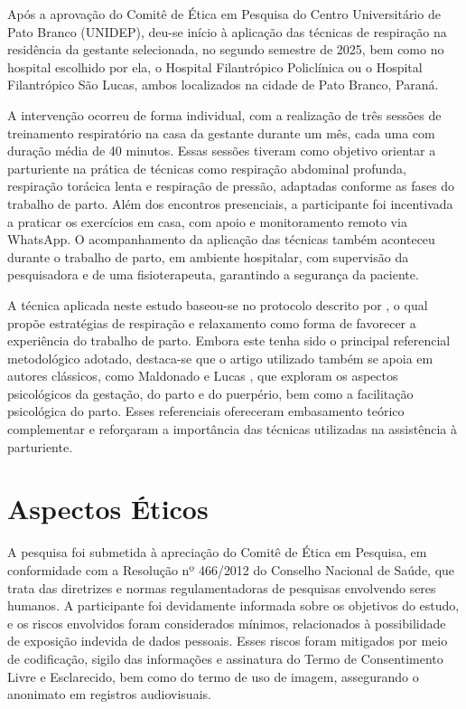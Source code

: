 \documentclass[openright]{tex/estilos/normas-utf-tex}
\begin{document}
Após a aprovação do Comitê de Ética em Pesquisa do Centro Universitário de Pato Branco (UNIDEP), deu-se início à aplicação das técnicas de respiração na residência da gestante selecionada, no segundo semestre de 2025, bem como no hospital escolhido por ela, o Hospital Filantrópico Policlínica ou o Hospital Filantrópico São Lucas, ambos localizados na cidade de Pato Branco, Paraná.

A intervenção ocorreu de forma individual, com a realização de três sessões de treinamento respiratório na casa da gestante durante um mês, cada uma com duração média de 40 minutos. Essas sessões tiveram como objetivo orientar a parturiente na prática de técnicas como respiração abdominal profunda, respiração torácica lenta e respiração de pressão, adaptadas conforme as fases do trabalho de parto. Além dos encontros presenciais, a participante foi incentivada a praticar os exercícios em casa, com apoio e monitoramento remoto via WhatsApp. O acompanhamento da aplicação das técnicas também aconteceu durante o trabalho de parto, em ambiente hospitalar, com supervisão da pesquisadora e de uma fisioterapeuta, garantindo a segurança da paciente.

A técnica aplicada neste estudo baseou-se no protocolo descrito por , o qual propõe estratégias de respiração e relaxamento como forma de favorecer a experiência do trabalho de parto. Embora este tenha sido o principal referencial metodológico adotado, destaca-se que o artigo utilizado também se apoia em autores clássicos, como Maldonado \citeyear{maldonado1991} e Lucas \citeyear{lucas1983}, que exploram os aspectos psicológicos da gestação, do parto e do puerpério, bem como a facilitação psicológica do parto. Esses referenciais ofereceram embasamento teórico complementar e reforçaram a importância das técnicas utilizadas na assistência à parturiente.

\section{Aspectos Éticos}
\label{sec:etica}

A pesquisa foi submetida à apreciação do Comitê de Ética em Pesquisa, em conformidade com a Resolução nº 466/2012 do Conselho Nacional de Saúde, que trata das diretrizes e normas regulamentadoras de pesquisas envolvendo seres humanos. A participante foi devidamente informada sobre os objetivos do estudo, e os riscos envolvidos foram considerados mínimos, relacionados à possibilidade de exposição indevida de dados pessoais. Esses riscos foram mitigados por meio de codificação, sigilo das informações e assinatura do Termo de Consentimento Livre e Esclarecido, bem como do termo de uso de imagem, assegurando o anonimato em registros audiovisuais.
\end{document}

